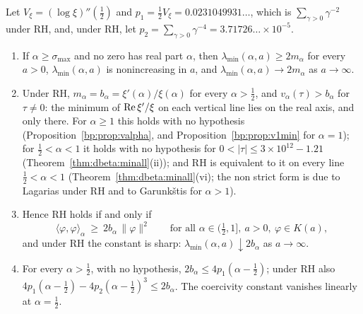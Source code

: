 \begin{theorem}\label{yo:thm:coercive}
Let $V_\xi=(\log\xi)''(\frac12)$ and $p_1=\frac12V_\xi=0.0231049931\ldots$, which is $\sum_{\gamma>0}\gamma^{-2}$ under RH, and, under RH, let $p_2=\sum_{\gamma>0}\gamma^{-4}=3.71726\ldots\times10^{-5}$.
\begin{enumerate}
\item[(i)] If $\alpha\ge\sigma_{\max}$ and no zero has real part $\alpha$, then $\lambda_{\min}(\alpha,a)\ge2m_\alpha$ for every $a>0$, $\lambda_{\min}(\alpha,a)$ is nonincreasing in $a$, and $\lambda_{\min}(\alpha,a)\to2m_\alpha$ as $a\to\infty$.
\item[(ii)] Under RH, $m_\alpha=b_\alpha=\xi'(\alpha)/\xi(\alpha)$ for every $\alpha>\frac12$, and $v_\alpha(\tau)>b_\alpha$ for $\tau\ne0$: the minimum of $\operatorname{Re}\xi'/\xi$ on each vertical line lies on the real axis, and only there. For $\alpha\ge1$ this holds with no hypothesis (Proposition~\ref{bp:prop:valpha}, and Proposition~\ref{bp:prop:v1min} for $\alpha=1$); for $\frac12<\alpha<1$ it holds with no hypothesis for $0<|\tau|\le3\times10^{12}-1.21$ (Theorem~\ref{thm:dbeta:minall}(ii)); and RH is equivalent to it on every line $\frac12<\alpha<1$ (Theorem~\ref{thm:dbeta:minall}(vi); the non strict form is due to Lagarias \cite{Lagarias} under RH and to Garunk\v{s}tis \cite{Garunkstis02} for $\alpha>1$).
\item[(iii)] Hence RH holds if and only if
\[
\langle\varphi,\varphi\rangle_\alpha\ \ge\ 2b_\alpha\,\|\varphi\|^2\qquad\text{for all }\alpha\in(\tfrac12,1],\ a>0,\ \varphi\in K(a),
\]
and under RH the constant is sharp: $\lambda_{\min}(\alpha,a)\downarrow2b_\alpha$ as $a\to\infty$.
\item[(iv)] For every $\alpha>\frac12$, with no hypothesis, $2b_\alpha\le4p_1(\alpha-\frac12)$; under RH also $4p_1(\alpha-\frac12)-4p_2(\alpha-\frac12)^3\le2b_\alpha$. The coercivity constant vanishes linearly at $\alpha=\frac12$.
\end{enumerate}
\end{theorem}

